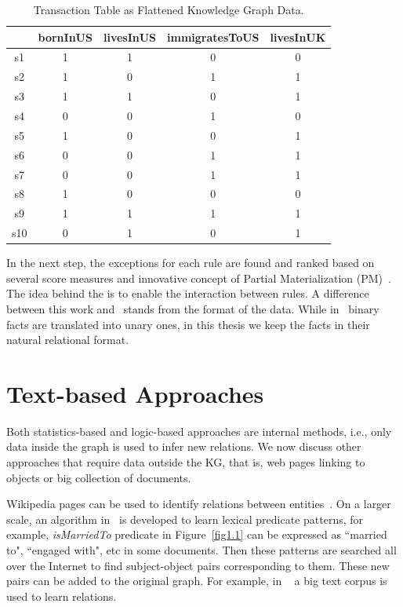 \begin{table}
\begin{center}
\begin{tabular}{|c|c|c|c|c|}
\hline
 & bornInUS & livesInUS & immigratesToUS & livesInUK\\
\hline\hline
s1 & 1 & 1 & 0 & 0\\
\hline
s2 & 1 & 0 & 1 & 1\\
\hline
s3 & 1 & 1 & 0 & 1\\
\hline
s4 & 0 & 0 & 1 & 0\\
\hline
s5 & 1 & 0 & 0 & 1\\
\hline
s6 & 0 & 0 & 1 & 1\\
\hline
s7 & 0 & 0 & 1 & 1\\
\hline
s8 & 1 & 0 & 0 & 0\\
\hline
s9 & 1 & 1 & 1 & 1\\
\hline
s10 & 0 & 1 & 0 & 1\\
\hline
\end{tabular}
\end{center}
\caption{Transaction Table as Flattened Knowledge Graph Data.}
\label{table2}
\end{table}

In the next step, the exceptions for each rule are found and ranked based on several score measures and innovative concept of Partial Materialization (PM)~\cite{ref12}. The idea behind the is to enable the interaction between rules. A difference between this work and~\cite{ref12} stands from the format of the data. While in~\cite{ref12} binary facts are translated into unary ones, in this thesis we keep the facts in their natural relational format.

\section{Text-based Approaches}

Both statistics-based and logic-based approaches are internal methods, i.e., only data inside the graph is used to infer new relations. We now discuss other approaches that require data outside the KG, that is, web pages linking to objects or big collection of documents.

Wikipedia pages can be used to identify relations between entities~\cite{ref18}. On a larger scale, an algorithm in~\cite{ref19} is developed to learn lexical predicate patterns, for example, \textit{isMarriedTo} predicate in Figure~\ref{fig1.1} can be expressed  as ``married to", ``engaged with", etc in some documents. Then these patterns are searched all over the Internet to find subject-object pairs corresponding to them. These new pairs can be added to the original graph. For example, in ~\cite{ref19} a  big text corpus is used to learn relations.

